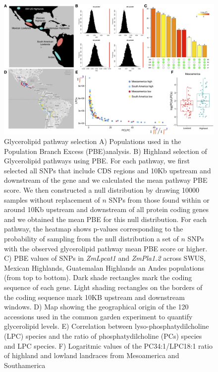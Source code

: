 \documentclass[9pt,twocolumn,twoside,lineno]{gsajnl}
\begin{document}
\begin{figure}[ht]
\begin{center}
\includegraphics[width=0.8\paperwidth]{Figures/Fig_1.png}
\caption{Glycerolipid pathway selection 
A) Populations used in the Population Branch Excess (PBE)analysis. 
B) Highland selection of Glycerolipid pathways using PBE. 
For each pathway, we first selected all SNPs that include CDS regions and 10Kb upstream and downstream of the gene and we calculated the mean pathway PBE score. 
We then constructed a null distribution by drawing 10000 samples without replacement of $n$ SNPs from those found within or around 10Kb upstream and downstream of all protein coding genes and we obtained the mean PBE for this null distribution. 
For each pathway, the heatmap shows p-values corresponding to the probability of sampling from the null distribution a set of $n$ SNPs with the observed glycerolipid pathway mean PBE score or higher.
C) PBE values of SNPs in \textit{ZmLpcat1} and \textit{ ZmPla1.2} across SWUS, Mexican Highlands, Guatemalan Highlands an Andes populations (from top to bottom). Dark shade rectangles mark the coding sequence of each gene. Light shading rectangles on the borders of the coding sequence mark 10KB upstream and downstream windows. 
D) Map showing the geographical origin of the 120 accessions used in the common garden experiment to quantify glycerolipid levels.
E) Correlation between  lyso-phosphatydilcholine (LPC) species and the ratio of  phosphatydilcholine (PCs) species and LPC species. 
F) Logaritmic values of the PC34:1/LPC18:1 ratio of highland and lowland landraces from Mesoamerica and Southamerica}
\label{Fig1}
\end{center}
\end{figure} 
\end{document}
